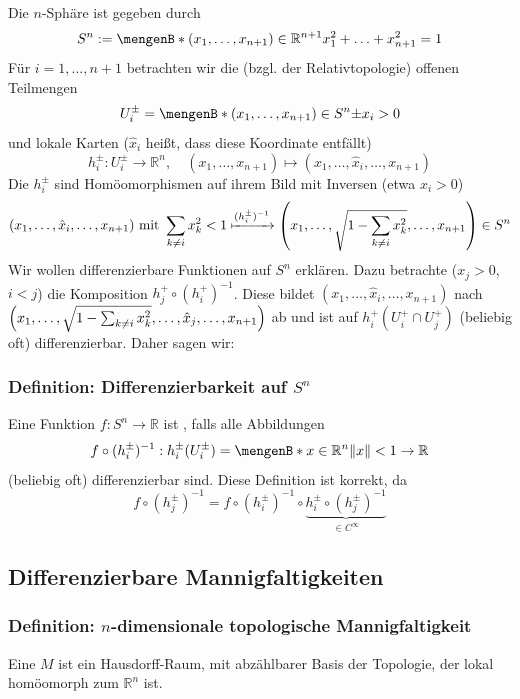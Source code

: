 Die $n$-Sphäre ist gegeben durch
\[
	S^n := \set[(x_1, \ldots , x_{n+1}) \in \mathds{R}^{n+1}]{x_1^2 + \ldots + x_{n+1}^2 = 1} 
\]
Für $i=1, \ldots , n+1$ betrachten wir die (bzgl. der Relativtopologie) offenen Teilmengen
\[
	U_i^{\pm} = \set[(x_1, \ldots , x_{n+1}) \in S^n]{\pm x_i >0} 
\]
und lokale Karten {\color{light_gray}\footnotesize($\hat x_i$ heißt, dass diese Koordinate entfällt)}
\[
	h_i^\pm : U_i^\pm \to \mathds{R}^n, \quad (x_1, \ldots , x_{n+1}) \mapsto (x_1, \ldots , \hat x_i, \ldots , x_{n+1}) \tag{weglassen}
\]
Die $h_i^\pm$ sind Homöomorphismen auf ihrem Bild mit Inversen (etwa $x_i >0$)
\[
	(x_1, \ldots , \hat x_i, \ldots , x_{n+1}) \text{ mit } \sum_{k\not= i} x_k^2< 1 \xmapsto{(h_i^\pm) ^{-1}} \enbrace*{x_1, \ldots , \sqrt{1- \sum_{k\not=i} x_k^2 }, \ldots , x_{n+1}  } \in S^{n}  
\]
Wir wollen differenzierbare Funktionen auf $S^n$ erklären. Dazu betrachte ($x_j >0$, $i<j$) die Komposition $h_j^+ \circ (h_i^+) ^{-1}$. Diese bildet
$(x_1, \ldots , \hat x_i, \ldots , x_{n+1})$ nach $\enbrace*{x_1, \ldots , \sqrt{1 - \sum_{k\not=i}x_k^2 }, \ldots , \hat x_j, \ldots , x_{n+1}  } $ ab und ist auf
$h_i^+(U_i^+ \cap U_j^+)$ (beliebig oft) differenzierbar. Daher sagen wir:

\subsubsection{Definition: Differenzierbarkeit auf $S^n$}
Eine Funktion $f : S^n \to \mathds{R}$ ist , falls alle Abbildungen 
\[
	f \circ (h_i^\pm) ^{-1} : h_i^\pm (U_i^\pm)  = \set[x \in \mathds{R}^n]{\norm{x}< 1 } \to \mathds{R} 
\]
(beliebig oft) differenzierbar sind.
Diese Definition ist korrekt, da 
\[
	f \circ (h_j^\pm) ^{-1} = f \circ (h_i^\pm) ^{-1} \circ \underbrace{h_i^\pm \circ (h_j^\pm) ^{-1}}_{\in C^\infty}
\]

\subsection{Differenzierbare Mannigfaltigkeiten} %
\label{sub:12}
\subsubsection{Definition: $n$-dimensionale topologische Mannigfaltigkeit}
\label{ssub:121}
Eine  $M$ ist ein 
Hausdorff-Raum, mit abzählbarer Basis der Topologie, der lokal homöomorph zum $\mathds{R}^n$ ist.



